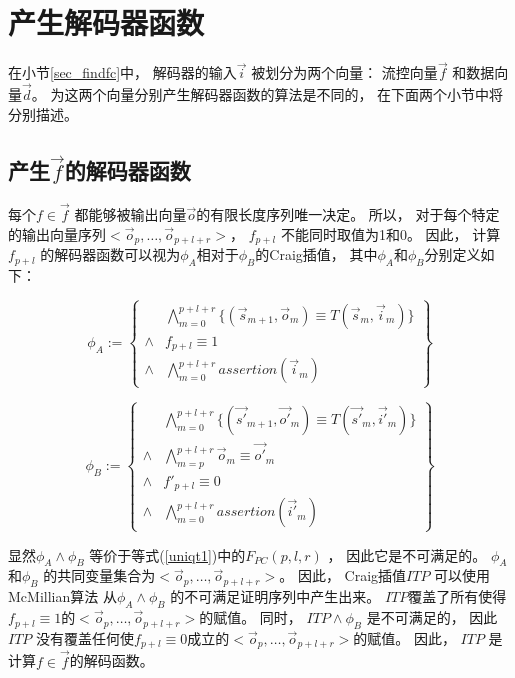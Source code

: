 \section{产生解码器函数}\label{sec_char_chap3}
在小节\ref{sec_findfc}中，
解码器的输入$\vec{i}$ 被划分为两个向量：
流控向量$\vec{f}$ 和数据向量$\vec{d}$。
为这两个向量分别产生解码器函数的算法是不同的，
在下面两个小节中将分别描述。

\subsection{产生$\vec{f}$的解码器函数}\label{subsec_fdec}

每个$f\in \vec{f}$ 都能够被输出向量$\vec{o}$的有限长度序列唯一决定。
所以，
对于每个特定的输出向量序列$<\vec{o}_p,\dots,\vec{o}_{p+l+r}>$，
$f_{p+l}$ 不能同时取值为1和0。
因此，
计算$f_{p+l}$ 的解码器函数可以视为$\phi_A$相对于$\phi_B$的Craig插值，
其中$\phi_A$和$\phi_B$分别定义如下：

\begin{equation}\label{fa}
\phi_A:=
\left\{
\begin{array}{cc}
&\bigwedge_{m=0}^{p+l+r}
\{
(\vec{s}_{m+1},\vec{o}_m)\equiv T(\vec{s}_m,\vec{i}_m)
\}
\\
\wedge& f_{p+l}\equiv 1 \\
\wedge&\bigwedge_{m=0}^{p+l+r}assertion(\vec{i}_m)
\end{array}
\right\}
\end{equation}

\begin{equation}\label{fb}
\phi_B:=
\left\{
\begin{array}{cc}
&\bigwedge_{m=0}^{p+l+r}
\{
(\vec{s'}_{m+1},\vec{o'}_m)\equiv T(\vec{s'}_m,\vec{i'}_m)
\}
\\
\wedge&\bigwedge_{m=p}^{p+l+r}\vec{o}_m\equiv \vec{o'}_m \\
\wedge& f'_{p+l}\equiv 0 \\
\wedge&\bigwedge_{m=0}^{p+l+r}assertion(\vec{i'}_m)
\end{array}
\right\}
\end{equation}

显然$\phi_A\wedge \phi_B$ 等价于等式(\ref{uniqt1})中的$F_{PC}(p,l,r)$ ，
因此它是不可满足的。
$\phi_A$ 和$\phi_B$ 的共同变量集合为$<\vec{o}_p,\dots,\vec{o}_{p+l+r}>$。
因此，
Craig插值$ITP$ 可以使用McMillian算法 从$\phi_A\wedge \phi_B$ 的不可满足证明序列中产生出来。
$ITP$覆盖了所有使得$f_{p+l}\equiv 1$的$<\vec{o}_p,\dots,\vec{o}_{p+l+r}>$的赋值。
同时，
$ITP\wedge \phi_B$ 是不可满足的，
因此$ITP$ 没有覆盖任何使$f_{p+l}\equiv 0$成立的$<\vec{o}_p,\dots,\vec{o}_{p+l+r}>$的赋值。
因此，
$ITP$ 是计算$f\in\vec{f}$的解码函数。

